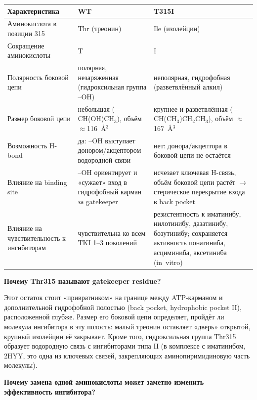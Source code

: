 \documentclass[11pt,a4paper]{article}
\newcommand{\code}[1]{{\ttfamily #1}}
\begin{document}
\begin{center}
\begin{tabular}{|L{3.6cm}|L{5.6cm}|L{5.6cm}|}
\hline
\textbf{Характеристика} & \textbf{WT} & \textbf{T315I} \\
\hline
Аминокислота в позиции 315 & Thr (треонин) & Ile (изолейцин) \\
\hline
Сокращение аминокислоты & T & I \\
\hline
Полярность боковой цепи & полярная, незаряженная (гидроксильная группа --OH) &
неполярная, гидрофобная (разветвлённый алкил) \\
\hline
Размер боковой цепи & небольшая ($-$CH(OH)CH$_3$), объём $\approx$116~\AA$^3$ &
крупнее и разветвлённая ($-$CH(CH$_3$)CH$_2$CH$_3$), объём $\approx$167~\AA$^3$ \\
\hline
Возможность H-bond & да: --OH выступает донором/акцептором водородной связи &
нет: донора/акцептора в боковой цепи не остаётся \\
\hline
Влияние на binding site & --OH ориентирует и «сужает» вход в гидрофобный карман за
gatekeeper & исчезает ключевая H-связь, объём боковой цепи растёт $\rightarrow$
стерическое перекрытие входа в back pocket \\
\hline
Влияние на чувствительность к ингибиторам & чувствительна ко всем TKI 1--3 поколений &
резистентность к иматинибу, нилотинибу, дазатинибу, бозутинибу; сохраняется активность
понатиниба, асциминиба, аксетиниба (in~vitro) \\
\hline
\end{tabular}
\end{center}

\textbf{Почему Thr315 называют gatekeeper residue?}

Этот остаток стоит «привратником» на границе между ATP-карманом и дополнительной
гидрофобной полостью (back pocket, hydrophobic pocket II), расположенной глубже. Размер
его боковой цепи определяет, пройдёт ли молекула ингибитора в эту полость: малый треонин
оставляет «дверь» открытой, крупный изолейцин её закрывает. Кроме того, гидроксильная
группа Thr315 образует водородную связь с ингибиторами типа II (в комплексе с
иматинибом, \code{2HYY}, это одна из ключевых связей, закрепляющих аминопиримидиновую
часть молекулы).

\textbf{Почему замена одной аминокислоты может заметно изменить эффективность
ингибитора?}
\end{document}
